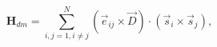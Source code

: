 \documentclass[preview]{standalone}
\begin{document}
\begin{varwidth}{50in}
  \begin{equation}
    \bm{H}_{dm} = \sum_{{ i,j}=1,i\neq j}^{N} 
    \left( \vec{e}_{ij} \times \vec{D} \right)
    \cdot\left(\vec{s}_{i}\times \vec{s}_{j}\right), 
    \nonumber
  \end{equation}
\end{varwidth}
\end{document}
